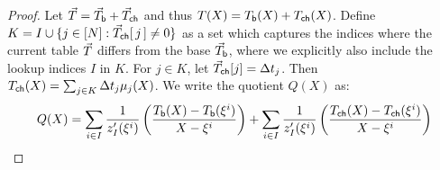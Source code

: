 \begin{proof}
    Let $\vec{T}=\vec{T}_{\mathsf{b}}+\vec{T}_{\mathsf{ch}}$ and thus $T(X)=T_{\mathsf{b}}({X})+T_{\mathsf{ch}}({X})$.
    Define $K=I\cup \{j\in [N]: \vec{T}_{\mathsf{ch}}[\,j\,]\neq 0\}$ as a set which captures the indices where the current table $\vec{T}$ differs from the base $\vec{T}_{\mathsf{b}}$,
    where we explicitly also include the lookup indices $I$ in $K$. For $j\in K$, let $\vec{T}_{\mathsf{ch}}[j]=\Delta t_j$. Then $T_{\mathsf{ch}}({X})=\sum_{j\in K}\Delta t_j\mu_j(X)$.
    We write the quotient $Q(X)$ as:
        {\small
    \begin{equation*}
        \begin{aligned}
            Q(X) = \sum_{i\in I}\frac{1}{z_I'(\xi^i)}\left(\frac{T_{\mathsf{b}}({X}) - T_{\mathsf{b}}({\xi^i})}{X-\xi^i}\right)
            + \sum_{i\in I}\frac{1}{z_I'(\xi^i)}\left(\frac{T_{\mathsf{ch}}({X}) - T_{\mathsf{ch}}({\xi^i})}{X-\xi^i}\right)
        \end{aligned}
    \end{equation*}
    }


\end{proof}

